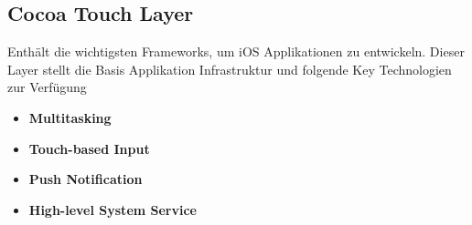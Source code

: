 \subsection{Cocoa Touch Layer}
\label{sec:CocoaTouchLayer}
Enthält die wichtigsten Frameworks, um iOS Applikationen zu entwickeln. Dieser
Layer stellt die Basis Applikation Infrastruktur und folgende Key Technologien zur Verfügung

	\begin{itemize}
		\item \textbf{Multitasking}
		\item \textbf{Touch-based Input}
		\item \textbf{Push Notification}
		\item \textbf{High-level System Service}	
	\end{itemize}

